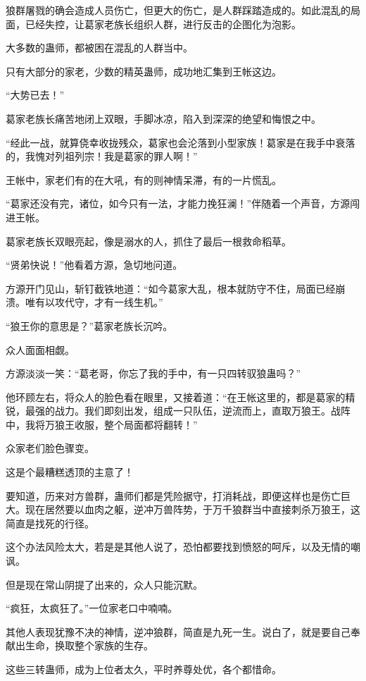 \begin{this_body}
狼群屠戮的确会造成人员伤亡，但更大的伤亡，是人群踩踏造成的。如此混乱的局面，已经失控，让葛家老族长组织人群，进行反击的企图化为泡影。

大多数的蛊师，都被困在混乱的人群当中。

只有大部分的家老，少数的精英蛊师，成功地汇集到王帐这边。

“大势已去！”

葛家老族长痛苦地闭上双眼，手脚冰凉，陷入到深深的绝望和悔恨之中。

“经此一战，就算侥幸收拢残众，葛家也会沦落到小型家族！葛家是在我手中衰落的，我愧对列祖列宗！我是葛家的罪人啊！”

王帐中，家老们有的在大吼，有的则神情呆滞，有的一片慌乱。

“葛家还没有完，诸位，如今只有一法，才能力挽狂澜！”伴随着一个声音，方源闯进王帐。

葛家老族长双眼亮起，像是溺水的人，抓住了最后一根救命稻草。

“贤弟快说！”他看着方源，急切地问道。

方源开门见山，斩钉截铁地道：“如今葛家大乱，根本就防守不住，局面已经崩溃。唯有以攻代守，才有一线生机。”

“狼王你的意思是？”葛家老族长沉吟。

众人面面相觑。

方源淡淡一笑：“葛老哥，你忘了我的手中，有一只四转驭狼蛊吗？”

他环顾左右，将众人的脸色看在眼里，又接着道：“在王帐这里的，都是葛家的精锐，最强的战力。我们即刻出发，组成一只队伍，逆流而上，直取万狼王。战阵中，我将万狼王收服，整个局面都将翻转！”

众家老们脸色骤变。

这是个最糟糕透顶的主意了！

要知道，历来对方兽群，蛊师们都是凭险据守，打消耗战，即便这样也是伤亡巨大。现在居然要以血肉之躯，逆冲万兽阵势，于万千狼群当中直接刺杀万狼王，这简直是找死的行径。

这个办法风险太大，若是是其他人说了，恐怕都要找到愤怒的呵斥，以及无情的嘲讽。

但是现在常山阴提了出来的，众人只能沉默。

“疯狂，太疯狂了。”一位家老口中喃喃。

其他人表现犹豫不决的神情，逆冲狼群，简直是九死一生。说白了，就是要自己奉献出生命，换取整个家族的生存。

这些三转蛊师，成为上位者太久，平时养尊处优，各个都惜命。

\end{this_body}

